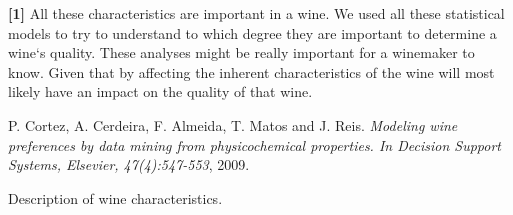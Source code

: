 \documentclass[11pt]{article}
\begin{document}
{\color{red}\textbf{[1]}} All these characteristics are important in a wine.
We used all these statistical models to try to understand to which degree they are important
to determine a wine`s quality.
These analyses might be really important for a winemaker to know.
Given that by affecting the inherent characteristics of the wine will most likely have an
impact on the quality of that wine.



\begin{thebibliography}{1}
 P. Cortez, A. Cerdeira, F. Almeida, T. Matos and J. Reis. {\em Modeling wine preferences by data mining from physicochemical properties.
In Decision Support Systems, Elsevier, 47(4):547-553},  2009.
\end{thebibliography}


\begin{table}
    \centering
    \caption{Description of wine characteristics.}
    \resizebox{\columnwidth}{!}{
    
    }
    \label{tab:description_wine}
\end{table}
\end{document}
